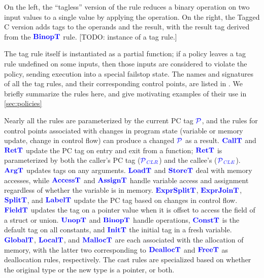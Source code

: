 \documentclass{llncs}
\begin{document}
\begin{minipage}[t]{0.37\textwidth}
  \binopsteptagless
\end{minipage}
\begin{minipage}[t]{0.6\textwidth}
  \binopstep
\end{minipage}

\noindent
On the left, the ``tagless'' version of the rule reduces a
binary operation on two input values to a single value by applying the operation.
On the right, the Tagged C version adds tags to the operands and the result, with the result tag
derived from the \(\binoptname\) rule. [TODO: instance of a tag rule.]

The tag rule itself is instantiated as a partial function; if a policy leaves a tag rule
undefined on some inputs, then those inputs are considered to violate the policy, sending
execution into a special failstop state. The names and signatures of all the tag rules,
and their corresponding control points, are listed in .
We briefly summarize the rules here, and give motivating examples of their use in \cref{sec:policies}

Nearly all the rules are parameterized by the current PC tag \(\PCT\), and the rules
for control points associated with changes in program state (variable or memory update,
change in control flow) can produce a changed \(\PCT\) as a result.
\(\calltname\) and \(\rettname\) update the PC tag on entry and exit from a function;
\(\rettname\) is parameterized by both the caller's PC tag (\(\PCT[_{\color{blue} CLR}]\))
and the callee's (\(\PCT[_{\color{blue} CLE}]\)). \(\argtname\) updates tags on any arguments.
\(\loadtname\) and \(\storetname\) deal with memory accesses, while \(\accesstname\) and
\(\assigntname\) handle variable access and assignment regardless of whether the variable
is in memory. \(\exprsplittname\), \(\exprjointname\), \(\splittname\), and \(\labeltname\)
update the PC tag based on changes in control flow. \(\fieldtname\) updates the tag
on a pointer value when it is offset to access the field of a struct or union.
\(\unoptname\) and \(\binoptname\) handle operations, \(\consttname\) is the default tag
on all constants, and \(\inittname\) the initial tag in a fresh variable. \(\globaltname\), \(\localtname\),
and \(\malloctname\) are each associated with the allocation of memory, with the latter
two corresponding to \(\dealloctname\) and \(\freetname\) as deallocation rules,
respectively. The cast rules are specialized based on whether the original type or
the new type is a pointer, or both.
\end{document}
